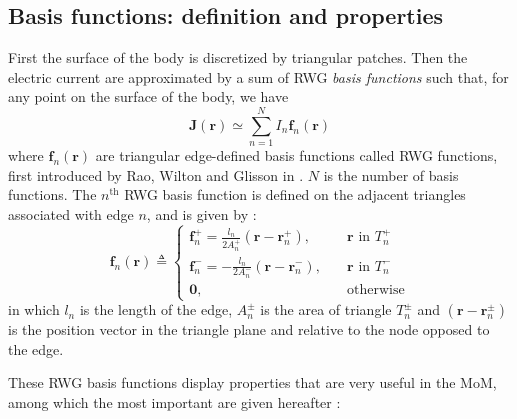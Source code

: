 \documentclass[a4paper,10pt]{book}
\newcommand{\vect}[1]{\mathbf{#1}}
\renewcommand{\arg}[1]{\ensuremath{\!\left(#1\right)}}
\begin{document}
\subsection{Basis functions: definition and properties}
\label{subsubsec:Basis functions: definition and properties}
%
\par
First the surface of the body is discretized by triangular patches. Then the electric current are approximated by a sum of RWG \emph{basis functions} such that, for any point on the surface of the body, we have
\begin{equation}\label{eqn:current_decomposition}
\vect{J}\arg{\vect{r}} \simeq \sum_{n = 1}^{N} I_n \vect{f}_n \arg{\vect{r}}
\end{equation}
where $\vect{f}_n \arg{\vect{r}}$ are triangular edge-defined basis functions called RWG functions, first introduced by Rao, Wilton and Glisson in \cite{Rao_82}. $N$ is the number of basis functions. The $n^\text{th}$ RWG basis function is defined on the adjacent triangles associated with edge $n$, and is given by \cite{Michalski_90}:
\begin{equation} \label{eqn:RWG definition}
\vect{f}_n \arg{\vect{r}} \triangleq
\begin{cases}
\vect{f}_n^+ = \frac{l_n}{2 A_n^+} \left( \vect{r} - \vect{r}_n^+\right), & \quad \text{$\vect{r}$ in $T_n^+$} \\
\vect{f}_n^- = -\frac{l_n}{2 A_n^-} \left( \vect{r} - \vect{r}_n^-\right), & \quad \text{$\vect{r}$ in $T_n^-$} \\
\vect{0}, & \quad \text{otherwise}
\end{cases}
\end{equation}
in which $l_n$ is the length of the edge, $A_n^\pm$ is the area of triangle $T_n^\pm$ and $\left( \vect{r} - \vect{r}_n^\pm\right)$ is the position vector in the triangle plane and relative to the node opposed to the edge.
%
\par
These RWG basis functions display properties that are very useful in the MoM, among which the most important are given hereafter \cite{Rao_82}:
\end{document}

